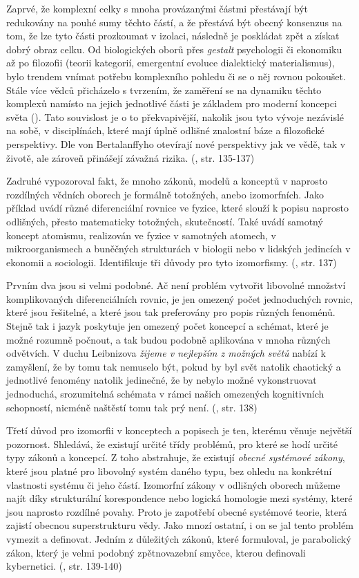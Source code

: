 \documentclass[11pt,a4paper]{article}
\begin{document}
Zaprvé, že komplexní celky s mnoha provázanými částmi přestávají být redukovány na pouhé sumy těchto částí, a že přestává být obecný konsenzus na tom, že lze tyto části prozkoumat v izolaci, následně je poskládat zpět a získat dobrý obraz celku. Od biologických oborů přes \textit{gestalt} psychologii či ekonomiku až po filozofii (teorii kategorií, emergentní evoluce dialektický materialismus), bylo trendem vnímat potřebu komplexního pohledu či se o něj rovnou pokoušet. Stále více vědců přicházelo s tvrzením, že zaměření se na dynamiku těchto komplexů namísto na jejich jednotlivé části je základem pro moderní koncepci světa (\cite{wiener_cybernetics_2019, gleick_chaos_1998}). Tato souvislost je o to překvapivější, nakolik jsou tyto vývoje nezávislé na sobě, v disciplínách, které mají úplně odlišné znalostní báze a filozofické perspektivy. Dle von Bertalanffyho otevírají nové perspektivy jak ve vědě, tak v životě, ale zároveň přinášejí závažná rizika. (\cite{von_bertalanffy_outline_1950}, str. 135-137)

Zadruhé vypozoroval fakt, že mnoho zákonů, modelů a konceptů v naprosto rozdílných vědních oborech je formálně totožných, anebo izomorfních. Jako příklad uvádí různé diferenciální rovnice ve fyzice, které slouží k popisu naprosto odlišných, přesto matematicky totožných, skutečností. Také uvádí samotný koncept atomismu, realizován ve fyzice v samotných atomech, v mikroorganismech a buněčných strukturách v biologii nebo v lidských jedincích v ekonomii a sociologii. Identifikuje tři důvody pro tyto izomorfismy. (\cite{von_bertalanffy_outline_1950}, str. 137)

Prvním dva jsou si velmi podobné. Ač není problém vytvořit libovolné množství komplikovaných diferenciálních rovnic, je jen omezený počet jednoduchých rovnic, které jsou řešitelné, a které jsou tak preferovány pro popis různých fenoménů. Stejně tak i jazyk poskytuje jen omezený počet koncepcí a schémat, které je možné rozumně počnout, a tak budou podobně aplikována v mnoha různých odvětvích. V duchu Leibnizova \textit{žijeme v nejlepším z možných světů} nabízí k zamyšlení, že by tomu tak nemuselo být, pokud by byl svět natolik chaotický a jednotlivé fenomény natolik jedinečné, že by nebylo možné vykonstruovat jednoduchá, srozumitelná schémata v rámci našich omezených kognitivních schopností, nicméně naštěstí tomu tak prý není. (\cite{von_bertalanffy_outline_1950}, str. 138)

Třetí důvod pro izomorfii v konceptech a popisech je ten, kterému věnuje největší pozornost. Shledává, že existují určité třídy problémů, pro které se hodí určité typy zákonů a koncepcí. Z toho abstrahuje, že existují \textit{obecné systémové zákony}, které jsou platné pro libovolný systém daného typu, bez ohledu na konkrétní vlastnosti systému či jeho částí. Izomorfní zákony v odlišných oborech můžeme najít díky strukturální korespondence nebo logická homologie mezi systémy, které jsou naprosto rozdílné povahy. Proto je zapotřebí obecné systémové teorie, která zajistí obecnou superstrukturu vědy. Jako mnozí ostatní, i on se jal tento problém vymezit a definovat. Jedním z důležitých zákonů, které formuloval, je parabolický zákon, který je velmi podobný zpětnovazební smyčce, kterou definovali kybernetici. (\cite{von_bertalanffy_outline_1950}, str. 139-140)
\end{document}
